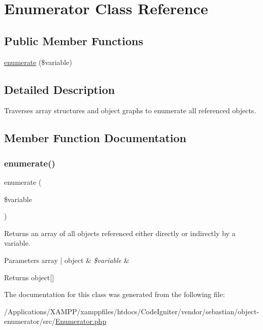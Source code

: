 \hypertarget{class_sebastian_bergmann_1_1_object_enumerator_1_1_enumerator}{}\section{Enumerator Class Reference}
\label{class_sebastian_bergmann_1_1_object_enumerator_1_1_enumerator}
\subsection*{Public Member Functions}
\begin{DoxyCompactItemize}
\item 
\mbox{\hyperlink{class_sebastian_bergmann_1_1_object_enumerator_1_1_enumerator_a421ad85cc16593bffcb8d82f631cbff9}{enumerate}} (\$variable)
\end{DoxyCompactItemize}


\subsection{Detailed Description}
Traverses array structures and object graphs to enumerate all referenced objects. 

\subsection{Member Function Documentation}
\mbox{\label{class_sebastian_bergmann_1_1_object_enumerator_1_1_enumerator_a421ad85cc16593bffcb8d82f631cbff9}} 
\subsubsection{\texorpdfstring{enumerate()}{enumerate()}}
{\footnotesize\ttfamily enumerate (\begin{DoxyParamCaption}\item[{}]{\$variable }\end{DoxyParamCaption})}

Returns an array of all objects referenced either directly or indirectly by a variable.


\begin{DoxyParams}[1]{Parameters}
array | object & {\em \$variable} & \\
\hline
\end{DoxyParams}
\begin{DoxyReturn}{Returns}
object\mbox{[}\mbox{]} 
\end{DoxyReturn}


The documentation for this class was generated from the following file\+:\begin{DoxyCompactItemize}
\item 
/\+Applications/\+X\+A\+M\+P\+P/xamppfiles/htdocs/\+Code\+Igniter/vendor/sebastian/object-\/enumerator/src/\mbox{\hyperlink{_enumerator_8php}{Enumerator.\+php}}\end{DoxyCompactItemize}

